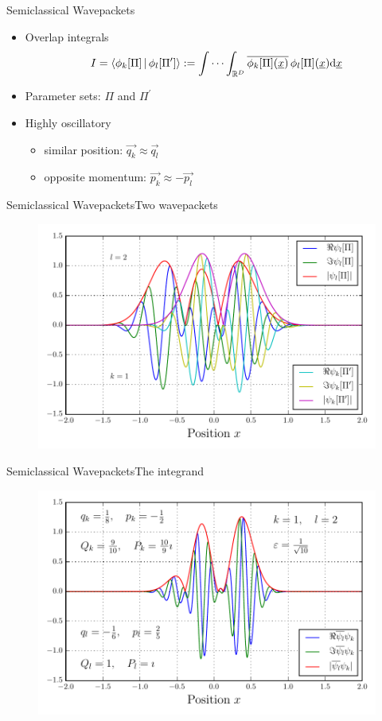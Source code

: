 \documentclass{beamer}
\begin{document}
\begin{frame}{Semiclassical Wavepackets}{}
  \begin{itemize}
    \item Overlap integrals
    \begin{equation*}
      I
      = \Braket{\phi_k[\Pi] | \phi_l[\Pi^\prime]}
      := \idotsint_{\mathbb{R}^D} \overline{\phi_k[\Pi](\underline{x})} \, \phi_l[\Pi](\underline{x}) \mathrm{d}\underline{x}
    \end{equation*}
    \item Parameter sets: $\Pi$ and $\Pi^\prime$
    \item Highly oscillatory
    \begin{itemize}
      \item similar position: $\vec{q_k} \approx \vec{q_l}$
      \item opposite momentum: $\vec{p_k} \approx -\vec{p_l}$
    \end{itemize}
  \end{itemize}
\end{frame}


\begin{frame}{Semiclassical Wavepackets}{Two wavepackets}
  \begin{figure}
    \centering
    \includegraphics[width=0.8\linewidth]{./fig/overlap_wavepackets.pdf}
  \end{figure}
\end{frame}


\begin{frame}{Semiclassical Wavepackets}{The integrand}
  \begin{figure}
    \centering
    \includegraphics[width=0.8\linewidth]{./fig/overlap_integrand.pdf}
  \end{figure}
\end{frame}
\end{document}
